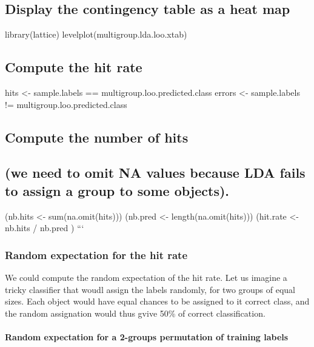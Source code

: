 \subsection{Display the contingency table as a heat
map}\label{display-the-contingency-table-as-a-heat-map-1}

library(lattice) levelplot(multigroup.lda.loo.xtab)

\subsection{Compute the hit rate}\label{compute-the-hit-rate-3}

hits \textless{}- sample.labels == multigroup.loo.predicted.class errors
\textless{}- sample.labels != multigroup.loo.predicted.class

\subsection{Compute the number of
hits}\label{compute-the-number-of-hits-1}

\subsection{(we need to omit NA values because LDA fails to assign a
group to some
objects).}\label{we-need-to-omit-na-values-because-lda-fails-to-assign-a-group-to-some-objects.-1}

(nb.hits \textless{}- sum(na.omit(hits))) (nb.pred \textless{}-
length(na.omit(hits))) (hit.rate \textless{}- nb.hits / nb.pred ) ```

\subsubsection{Random expectation for the hit
rate}\label{random-expectation-for-the-hit-rate-1}

We could compute the random expectation of the hit rate. Let us imagine
a tricky classifier that woudl assign the labels randomly, for two
groups of equal sizes. Each object would have equal chances to be
assigned to it correct class, and the random assignation would thus
gvive 50\% of correct classification.

\paragraph{Random expectation for a 2-groups permutation of training
labels}\label{random-expectation-for-a-2-groups-permutation-of-training-labels}

